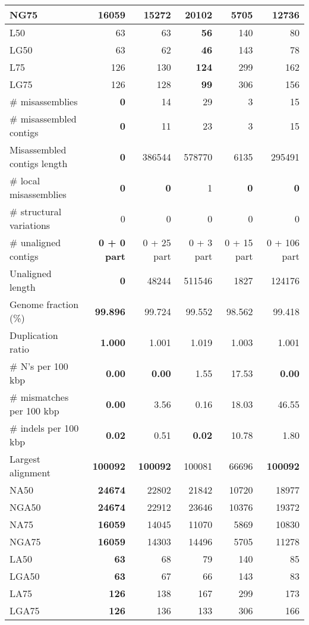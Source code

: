 \documentclass[12pt,a4paper]{article}
\begin{document}
\begin{table}[ht]
\begin{center}
\begin{tabular}{|l*{5}{|r}|}
NG75 & 16059 & 15272 & {\bf 20102} & 5705 & 12736 \\ \hline
L50 & 63 & 63 & {\bf 56} & 140 & 80 \\ \hline
LG50 & 63 & 62 & {\bf 46} & 143 & 78 \\ \hline
L75 & 126 & 130 & {\bf 124} & 299 & 162 \\ \hline
LG75 & 126 & 128 & {\bf 99} & 306 & 156 \\ \hline
\# misassemblies & {\bf 0} & 14 & 29 & 3 & 15 \\ \hline
\# misassembled contigs & {\bf 0} & 11 & 23 & 3 & 15 \\ \hline
Misassembled contigs length & {\bf 0} & 386544 & 578770 & 6135 & 295491 \\ \hline
\# local misassemblies & {\bf 0} & {\bf 0} & 1 & {\bf 0} & {\bf 0} \\ \hline
\# structural variations & 0 & 0 & 0 & 0 & 0 \\ \hline
\# unaligned contigs & {\bf 0 + 0 part} & 0 + 25 part & 0 + 3 part & 0 + 15 part & 0 + 106 part \\ \hline
Unaligned length & {\bf 0} & 48244 & 511546 & 1827 & 124176 \\ \hline
Genome fraction (\%) & {\bf 99.896} & 99.724 & 99.552 & 98.562 & 99.418 \\ \hline
Duplication ratio & {\bf 1.000} & 1.001 & 1.019 & 1.003 & 1.001 \\ \hline
\# N's per 100 kbp & {\bf 0.00} & {\bf 0.00} & 1.55 & 17.53 & {\bf 0.00} \\ \hline
\# mismatches per 100 kbp & {\bf 0.00} & 3.56 & 0.16 & 18.03 & 46.55 \\ \hline
\# indels per 100 kbp & {\bf 0.02} & 0.51 & {\bf 0.02} & 10.78 & 1.80 \\ \hline
Largest alignment & {\bf 100092} & {\bf 100092} & 100081 & 66696 & {\bf 100092} \\ \hline
NA50 & {\bf 24674} & 22802 & 21842 & 10720 & 18977 \\ \hline
NGA50 & {\bf 24674} & 22912 & 23646 & 10376 & 19372 \\ \hline
NA75 & {\bf 16059} & 14045 & 11070 & 5869 & 10830 \\ \hline
NGA75 & {\bf 16059} & 14303 & 14496 & 5705 & 11278 \\ \hline
LA50 & {\bf 63} & 68 & 79 & 140 & 85 \\ \hline
LGA50 & {\bf 63} & 67 & 66 & 143 & 83 \\ \hline
LA75 & {\bf 126} & 138 & 167 & 299 & 173 \\ \hline
LGA75 & {\bf 126} & 136 & 133 & 306 & 166 \\ \hline
\end{tabular}
\end{center}
\end{table}
\end{document}
